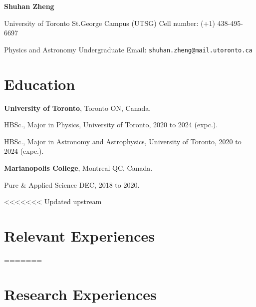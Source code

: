\documentclass{article}
\newcommand{\cvsection}[1]{\section*{\rmfamily#1}}
\begin{document}
\begin{center}
    \Huge{
    \rmfamily
    \textbf{Shuhan Zheng}}
\end{center}
\vspace{15pt}    

\setlength{\parskip}{0.5pt}
\renewcommand{\arraystretch}{1.25}


\noindent University of Toronto St.George Campus (UTSG)  \hfill Cell number: (+1) 438-495-6697

\noindent Physics and Astronomy Undergraduate \hfill {Email: \texttt{shuhan.zheng@mail.utoronto.ca}}


\setlength{\parskip}{2pt}






\cvsection{Education}
\indent 

\textbf{University of Toronto}, Toronto ON, Canada.

\hspace{2em} HBSc., Major in Physics, University of Toronto, 2020 to 2024 (expc.).

\hspace{2em} HBSc., Major in Astronomy and Astrophysics, University of Toronto, 2020 to 2024 (expc.).

\textbf{Marianopolis College}, Montreal QC, Canada.

\hspace{2em} Pure \& Applied Science DEC, 2018 to 2020.

<<<<<<< Updated upstream
\cvsection{Relevant Experiences}

=======
\cvsection{Research Experiences}
\end{document}
